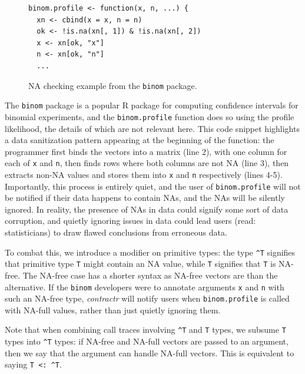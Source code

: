 \documentclass[acmsmall,review,anonymous]{acmart}\settopmatter{printfolios=true,printccs=false,printacmref=false}
\newcommand{\code}[1]{{\lstinline[style=Rin]!#1!}\xspace}
\newcommand{\contractr}{\emph{contractr}\xspace} %
\begin{document}
\begin{figure}[htbp]
\begin{center}

\begin{lstlisting}
binom.profile <- function(x, n, ...) {
  xn <- cbind(x = x, n = n)
  ok <- !is.na(xn[, 1]) & !is.na(xn[, 2])
  x <- xn[ok, "x"]
  n <- xn[ok, "n"]
  ...
\end{lstlisting}

\caption{NA checking example from the \code{binom} package.}
\label{fig:na-example}
\end{center}
\end{figure}

The \code{binom} package is a popular R package for computing confidence
intervals for binomial experiments, and the \code{binom.profile} function
does so using the profile likelihood, the details of which are not relevant
here.  This code snippet highlights a data sanitization pattern appearing at
the beginning of the function: the programmer first binds the vectors into a
matrix (line 2), with one column for each of \code{x} and \code{n}, then
finds rows where both columns are not NA (line 3), then extracts non-NA
values and stores them into \code{x} and \code{n} respectively (lines 4-5).
Importantly, this process is entirely quiet, and the user of
\code{binom.profile} will not be notified if their data happens to contain
NAs, and the NAs will be silently ignored.  In reality, the presence of NAs
in data could signify some sort of data corruption, and quietly ignoring
issues in data could lead users (read: statisticians) to draw flawed
conclusions from erroneous data.

To combat this, we introduce a modifier on primitive types: the type
\code{^T} signifies that primitive type \code{T} might contain an NA value,
while \code{T} signifies that \code{T} is NA-free.  The NA-free case has a
shorter syntax as NA-free vectors are  than the alternative.
If the \code{binom} developers were to annotate arguments \code{x} and
\code{n} with such an NA-free type, \contractr will notify users when
\code{binom.profile} is called with NA-full values, rather than just quietly
ignoring them.

Note that when combining call traces involving \code{^T} and \code{T} types,
we subsume \code{T} types into \code{^T} types: if NA-free and NA-full
vectors are passed to an argument, then we say that the argument can handle
NA-full vectors.  This is equivalent to saying \code{T <: ^T}.
\end{document}

